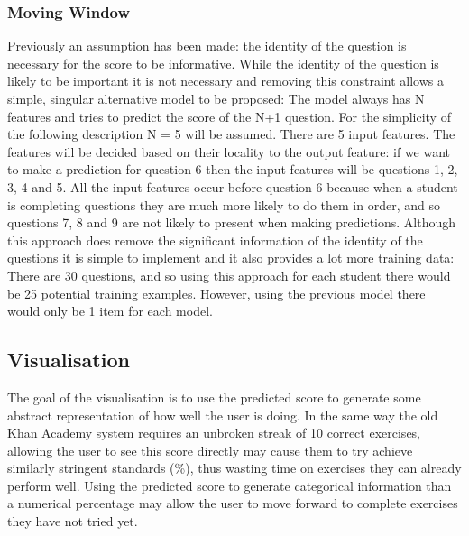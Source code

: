 \subsubsection{Moving Window}
Previously an assumption has been made: the identity of the question is necessary for the score to be informative. While the identity of the question is likely to be important it is not necessary and removing this constraint allows a simple, singular alternative model to be proposed: The model always has N features and tries to predict the score of the N+1 question. For the simplicity of the following description N = 5 will be assumed.
There are 5 input features. The features will be decided based on their locality to the output feature: if we want to make a prediction for question 6 then the input features will be questions 1, 2, 3, 4 and 5. All the input features occur before question 6 because when a student is completing questions they are much more likely to do them in order, and so questions 7, 8 and 9 are not likely to present when making predictions. 
Although this approach does remove the significant information of the identity of the questions it is simple to implement and it also provides a lot more training data: There are 30 questions, and so using this approach for each student there would be 25 potential training examples. However, using the previous model there would only be 1 item for each model.

\subsection{Visualisation}
The goal of the visualisation is to use the predicted score to generate some abstract representation of how well the user is doing. In the same way the old Khan Academy system requires an unbroken streak of 10 correct exercises, allowing the user to see this score directly may cause them to try achieve similarly stringent standards (\%), thus wasting time on exercises they can already perform well. Using the predicted score to generate categorical information than a numerical percentage may allow the user to move forward to complete exercises they have not tried yet.

